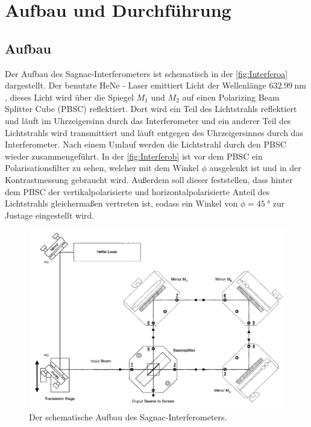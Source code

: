 \section{Aufbau und Durchführung}
\label{sec:Durchführung}

\subsection{Aufbau}

\noindent Der Aufbau des Sagnac-Interferometers ist schematisch in der \autoref{fig:Interferoa} dargestellt. Der benutzte HeNe - Laser emittiert Licht der 
Wellenlänge $\SI{632.99}{\nano\metre}$ \cite{anleitung}, dieses Licht wird über die Spiegel $M_1$ und $M_2$ auf einen Polarizing Beam Splitter Cube (PBSC) reflektiert. 
Dort wird ein Teil des Lichtstrahls reflektiert und läuft im Uhrzeigersinn durch das Interferometer und ein anderer Teil des Lichtstrahls wird 
transmittiert und läuft entgegen des Uhrzeigersinnes durch das Interferometer. Nach einem Umlauf werden die Lichtstrahl durch den PBSC wieder zusammengeführt. In der 
\autoref{fig:Interferob} ist vor dem PBSC ein Polarisationsfilter zu sehen, welcher mit dem Winkel $\phi$ ausgelenkt ist und in der Kontrastmessung gebraucht wird. 
Außerdem soll dieser feststellen, dass hinter dem PBSC der vertikalpolarisierte und horizontalpolarisierte Anteil des Lichtstrahls gleichermaßen vertreten ist, sodass ein Winkel von $\phi = \SI{45}{\degree}$
zur Justage eingestellt wird.  

\begin{figure}[H]
    \centering
    \includegraphics[width=\textwidth]{bilder/Interferometer.png}
    \caption{Der schematische Aufbau des Sagnac-Interferometers. \cite{anleitung}}
    \label{fig:Interferoa}
\end{figure}

